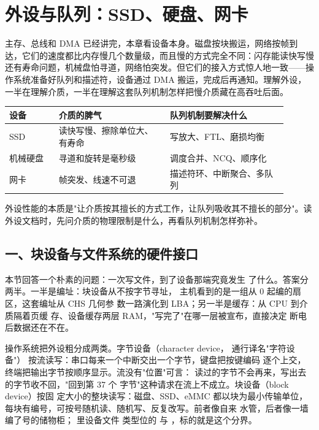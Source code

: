 \chapter{外设与队列：SSD、硬盘、网卡}

主存、总线和 DMA 已经讲完，本章看设备本身。磁盘按块搬运，网络按帧到达，它们的速度都比内存慢几个数量级，而且慢的方式完全不同：闪存能读快写慢还有寿命问题，机械盘怕寻道，网络怕突发。但它们的接入方式惊人地一致——操作系统准备好队列和描述符，设备通过 DMA 搬运，完成后再通知。理解外设，一半在理解介质，一半在理解这套队列机制怎样把慢介质藏在高吞吐后面。

\begin{longtable}{L{0.16\linewidth}L{0.36\linewidth}L{0.38\linewidth}}
\toprule
设备 & 介质的脾气 & 队列机制要解决什么 \\
\midrule
SSD & 读快写慢、擦除单位大、有寿命 & 写放大、FTL、磨损均衡 \\
机械硬盘 & 寻道和旋转是毫秒级 & 调度合并、NCQ、顺序化 \\
网卡 & 帧突发、线速不可退 & 描述符环、中断聚合、多队列 \\
\bottomrule
\end{longtable}

\begin{keyidea}
外设性能的本质是"让介质按其擅长的方式工作，让队列吸收其不擅长的部分"。读外设文档时，先问介质的物理限制是什么，再看队列机制怎样弥补。
\end{keyidea}

\section{一、块设备与文件系统的硬件接口}

本节回答一个朴素的问题：一次写文件，到了设备那端究竟发生
了什么。答案分两半。一半是编址：块设备从不按字节寻址，
主机看到的是一组从 0 起编的扇区，这套编址从 CHS 几何参
数一路演化到 LBA；另一半是缓存：从 CPU 到介质隔着页缓
存、设备缓存两层 RAM，"写完了"在哪一层被宣布，直接决定
断电后数据还在不在。

操作系统把外设粗分成两类。字节设备（character device，
通行译名"字符设备"）
按流读写：串口每来一个中断交出一个字节，键盘把按键编码
逐个上交，终端把输出字节按顺序显示。流没有"位置"可言：
读过的字节不会再来，写出去的字节收不回，"回到第 37 个
字节"这种请求在流上不成立。块设备（block device）按固
定大小的整块读写：磁盘、SSD、eMMC 都以块为最小传输单位，
每块有编号，可按号随机读、随机写、反复改写。前者像自来
水管，后者像一墙编了号的储物柜； 里设备文件
类型位的  与 ，标的就是这个分界。

